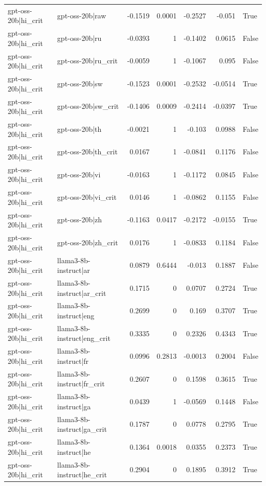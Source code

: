 \begin{table}
\begin{tabular}{l l r r r r l}
gpt-oss-20b|hi_crit & gpt-oss-20b|raw & -0.1519 & 0.0001 & -0.2527 & -0.051 & True \\
gpt-oss-20b|hi_crit & gpt-oss-20b|ru & -0.0393 & 1 & -0.1402 & 0.0615 & False \\
gpt-oss-20b|hi_crit & gpt-oss-20b|ru_crit & -0.0059 & 1 & -0.1067 & 0.095 & False \\
gpt-oss-20b|hi_crit & gpt-oss-20b|sw & -0.1523 & 0.0001 & -0.2532 & -0.0514 & True \\
gpt-oss-20b|hi_crit & gpt-oss-20b|sw_crit & -0.1406 & 0.0009 & -0.2414 & -0.0397 & True \\
gpt-oss-20b|hi_crit & gpt-oss-20b|th & -0.0021 & 1 & -0.103 & 0.0988 & False \\
gpt-oss-20b|hi_crit & gpt-oss-20b|th_crit & 0.0167 & 1 & -0.0841 & 0.1176 & False \\
gpt-oss-20b|hi_crit & gpt-oss-20b|vi & -0.0163 & 1 & -0.1172 & 0.0845 & False \\
gpt-oss-20b|hi_crit & gpt-oss-20b|vi_crit & 0.0146 & 1 & -0.0862 & 0.1155 & False \\
gpt-oss-20b|hi_crit & gpt-oss-20b|zh & -0.1163 & 0.0417 & -0.2172 & -0.0155 & True \\
gpt-oss-20b|hi_crit & gpt-oss-20b|zh_crit & 0.0176 & 1 & -0.0833 & 0.1184 & False \\
gpt-oss-20b|hi_crit & llama3-8b-instruct|ar & 0.0879 & 0.6444 & -0.013 & 0.1887 & False \\
gpt-oss-20b|hi_crit & llama3-8b-instruct|ar_crit & 0.1715 & 0 & 0.0707 & 0.2724 & True \\
gpt-oss-20b|hi_crit & llama3-8b-instruct|eng & 0.2699 & 0 & 0.169 & 0.3707 & True \\
gpt-oss-20b|hi_crit & llama3-8b-instruct|eng_crit & 0.3335 & 0 & 0.2326 & 0.4343 & True \\
gpt-oss-20b|hi_crit & llama3-8b-instruct|fr & 0.0996 & 0.2813 & -0.0013 & 0.2004 & False \\
gpt-oss-20b|hi_crit & llama3-8b-instruct|fr_crit & 0.2607 & 0 & 0.1598 & 0.3615 & True \\
gpt-oss-20b|hi_crit & llama3-8b-instruct|ga & 0.0439 & 1 & -0.0569 & 0.1448 & False \\
gpt-oss-20b|hi_crit & llama3-8b-instruct|ga_crit & 0.1787 & 0 & 0.0778 & 0.2795 & True \\
gpt-oss-20b|hi_crit & llama3-8b-instruct|he & 0.1364 & 0.0018 & 0.0355 & 0.2373 & True \\
gpt-oss-20b|hi_crit & llama3-8b-instruct|he_crit & 0.2904 & 0 & 0.1895 & 0.3912 & True \\

\end{tabular}
\end{table}
